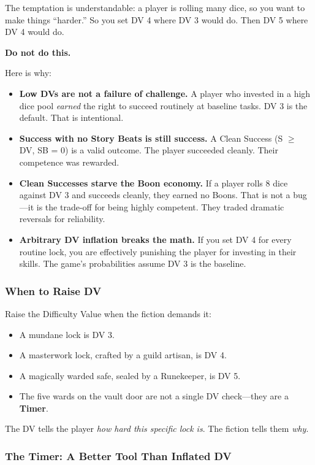The temptation is understandable: a player is rolling many dice, so you want to make things ``harder.'' So you set DV 4 where DV 3 would do. Then DV 5 where DV 4 would do.

\textbf{Do not do this.}

Here is why:

\begin{itemize}
  \item \textbf{Low DVs are not a failure of challenge.} A player who invested in a high dice pool \textit{earned} the right to succeed routinely at baseline tasks. DV 3 is the default. That is intentional.
  \item \textbf{Success with no Story Beats is still success.} A Clean Success (S $\ge$ DV, SB = 0) is a valid outcome. The player succeeded cleanly. Their competence was rewarded.
  \item \textbf{Clean Successes starve the Boon economy.} If a player rolls 8 dice against DV 3 and succeeds cleanly, they earned no Boons. That is not a bug---it is the trade-off for being highly competent. They traded dramatic reversals for reliability.
  \item \textbf{Arbitrary DV inflation breaks the math.} If you set DV 4 for every routine lock, you are effectively punishing the player for investing in their skills. The game's probabilities assume DV 3 is the baseline.
\end{itemize}

\subsubsection{When to Raise DV}

Raise the Difficulty Value when the fiction demands it:

\begin{itemize}
  \item A mundane lock is DV 3.
  \item A masterwork lock, crafted by a guild artisan, is DV 4.
  \item A magically warded safe, sealed by a Runekeeper, is DV 5.
  \item The five wards on the vault door are not a single DV check---they are a \textbf{Timer}.
\end{itemize}

The DV tells the player \textit{how hard this specific lock is}. The fiction tells them \textit{why}.

\subsubsection{The Timer: A Better Tool Than Inflated DV}

